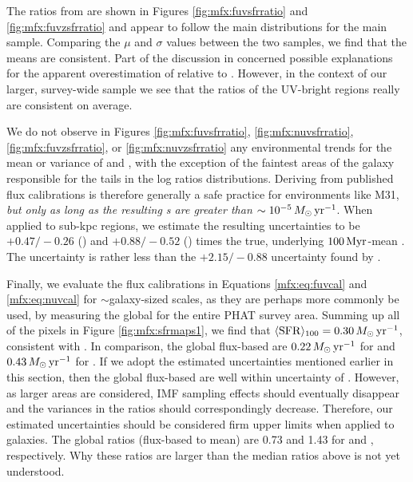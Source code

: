 \documentclass[iop, tighten]{emulateapj}
\begin{document}
The \fuv{} \sfr{} ratios from \citet{Simones:2014} are shown in Figures
\ref{fig:mfx:fuvsfrratio} and \ref{fig:mfx:fuvzsfrratio} and appear to follow
the main distributions for the main sample. Comparing the $\mu$ and $\sigma$
values between the two samples, we find that the means are consistent. Part of
the discussion in \citet{Simones:2014} concerned possible explanations for the
apparent overestimation of  relative to \sfroneh{}. However, in the
context of our larger, survey-wide sample we see that the \sfr{} ratios of the
UV-bright regions really are consistent on average.

We do not observe in Figures \ref{fig:mfx:fuvsfrratio},
\ref{fig:mfx:nuvsfrratio}, \ref{fig:mfx:fuvzsfrratio}, or
\ref{fig:mfx:nuvzsfrratio} any environmental trends for the mean or variance of
\sfrx{} and \sfrxz{}, with the exception of the faintest areas of the galaxy
responsible for the tails in the log \sfr{} ratios distributions. Deriving
 from published flux calibrations is therefore generally a safe practice
for environments like M31, \emph{but only as long as the resulting \sfr{}s are
greater than $\sim 10^{-5}\,M_\odot\,\mathrm{yr}^{-1}$}. When applied to sub-kpc regions, we
estimate the resulting uncertainties to be $+\!0.47/\!-\!0.26$ (\fuv{}) and
$+\!0.88/\!-\!0.52$ (\nuv{}) times the true, underlying $100\,\mathrm{Myr}$-mean \sfr{}.
The \sfrfuv{} uncertainty is rather less than the $+\!2.15/\!-\!0.88$
uncertainty found by \citet{Simones:2014}.

Finally, we evaluate the flux calibrations in Equations \ref{mfx:eq:fuvcal} and
\ref{mfx:eq:nuvcal} for $\sim$galaxy-sized scales, as they are perhaps more
commonly be used, by measuring the global \sfr{} for the entire PHAT survey
area. Summing up all of the pixels in Figure \ref{fig:mfx:sfrmaps1}, we find
that $\langle\mathrm{SFR}\rangle_{100}=0.30\,M_\odot\,\mathrm{yr}^{-1}$, consistent with \citet{Lewis:2014}. In
comparison, the global flux-based  are $0.22\,M_\odot\,\mathrm{yr}^{-1}$ for \fuv{}
and $0.43\,M_\odot\,\mathrm{yr}^{-1}$ for \nuv{}. If we adopt the estimated uncertainties
mentioned earlier in this section, then the global flux-based  are well
within uncertainty of \sfroneh{}. However, as larger areas are considered, IMF
sampling effects should eventually disappear and the variances in the \sfr{}
ratios should correspondingly decrease. Therefore, our estimated uncertainties
should be considered firm upper limits when applied to galaxies. The global
\sfr{} ratios (flux-based to mean) are 0.73 and 1.43 for \fuv{} and \nuv{},
respectively. Why these ratios are larger than the median ratios above is not
yet understood.
\end{document}
